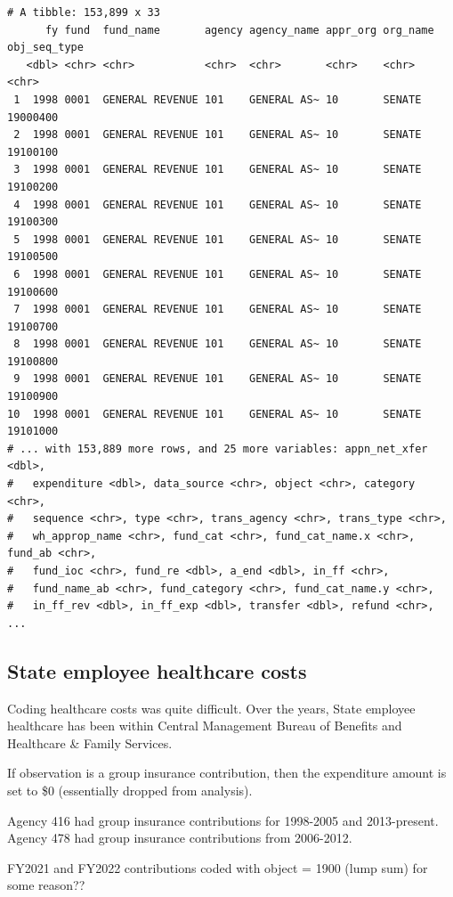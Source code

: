 \documentclass[
  letterpaper,
  DIV=11,
  numbers=noendperiod]{scrreport}
\begin{document}
\begin{verbatim}
# A tibble: 153,899 x 33
      fy fund  fund_name       agency agency_name appr_org org_name obj_seq_type
   <dbl> <chr> <chr>           <chr>  <chr>       <chr>    <chr>    <chr>       
 1  1998 0001  GENERAL REVENUE 101    GENERAL AS~ 10       SENATE   19000400    
 2  1998 0001  GENERAL REVENUE 101    GENERAL AS~ 10       SENATE   19100100    
 3  1998 0001  GENERAL REVENUE 101    GENERAL AS~ 10       SENATE   19100200    
 4  1998 0001  GENERAL REVENUE 101    GENERAL AS~ 10       SENATE   19100300    
 5  1998 0001  GENERAL REVENUE 101    GENERAL AS~ 10       SENATE   19100500    
 6  1998 0001  GENERAL REVENUE 101    GENERAL AS~ 10       SENATE   19100600    
 7  1998 0001  GENERAL REVENUE 101    GENERAL AS~ 10       SENATE   19100700    
 8  1998 0001  GENERAL REVENUE 101    GENERAL AS~ 10       SENATE   19100800    
 9  1998 0001  GENERAL REVENUE 101    GENERAL AS~ 10       SENATE   19100900    
10  1998 0001  GENERAL REVENUE 101    GENERAL AS~ 10       SENATE   19101000    
# ... with 153,889 more rows, and 25 more variables: appn_net_xfer <dbl>,
#   expenditure <dbl>, data_source <chr>, object <chr>, category <chr>,
#   sequence <chr>, type <chr>, trans_agency <chr>, trans_type <chr>,
#   wh_approp_name <chr>, fund_cat <chr>, fund_cat_name.x <chr>, fund_ab <chr>,
#   fund_ioc <chr>, fund_re <dbl>, a_end <dbl>, in_ff <chr>,
#   fund_name_ab <chr>, fund_category <chr>, fund_cat_name.y <chr>,
#   in_ff_rev <dbl>, in_ff_exp <dbl>, transfer <dbl>, refund <chr>, ...
\end{verbatim}

\hypertarget{state-employee-healthcare-costs}{%
\subsection{State employee healthcare
costs}\label{state-employee-healthcare-costs}}

Coding healthcare costs was quite difficult. Over the years, State
employee healthcare has been within Central Management Bureau of
Benefits and Healthcare \& Family Services.

If observation is a group insurance contribution, then the expenditure
amount is set to \$0 (essentially dropped from analysis).

Agency 416 had group insurance contributions for 1998-2005 and
2013-present. Agency 478 had group insurance contributions from
2006-2012.

FY2021 and FY2022 contributions coded with object = 1900 (lump sum) for
some reason??
\end{document}
